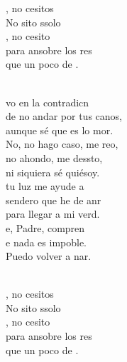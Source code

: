 \documentclass[12pt]{article}
\begin{document}
\begin{multicols*}{2}
\begin{cancion}[Un poco de fe][Ixcís]%
	\begin{chorus}%
	, no cesitos\\
	No sito ssolo  \\
	, no cesito \\
	para ansobre los res\\
	que un poco de .\\
	\end{chorus}%
	\jump\\
	vo en la contradicn\\
	de no andar por tus canos,\\
	aunque sé que es lo mor.\\
	No, no hago caso, me reo,\\
	no ahondo, me dessto,\\
	ni siquiera sé quiésoy.\\
	tu luz me ayude a\\
	 sendero que he de anr\\
	para llegar a mi verd.\\
	e, Padre, compren\\
	e nada es impoble.\\
	Puedo volver a nar.\\\jump\\
	\begin{chorus}%
	, no cesitos\\
	No sito ssolo  \\
	, no cesito \\
	para ansobre los res\\
	que un poco de .\\
	\end{chorus}%
	\jump\\

\end{cancion}
\end{multicols*}
\end{document}
